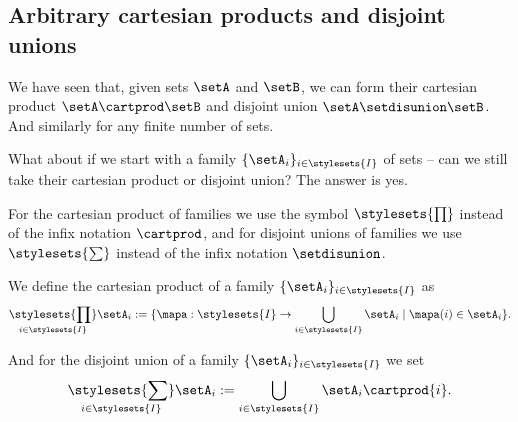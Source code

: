\subsection{Arbitrary cartesian products and disjoint unions}

We have seen that, given sets $\setA$ and $\setB$, we can form their cartesian product $\setA \cartprod \setB$ and disjoint union $\setA \setdisunion \setB$.
And similarly for any finite number of sets.

What about if we start with a family $\{ \setA_i \}_{i \in \stylesets{I}}$ of sets -- can we still take their cartesian product or disjoint union?
The answer is yes.

For the cartesian product of families we use the symbol $\stylesets{\prod}$ instead of the infix notation $\cartprod$, and for disjoint unions of families we use $\stylesets{\sum}$ instead of the infix notation $\setdisunion$.

We define the cartesian product of a family $\{ \setA_i \}_{i \in \stylesets{I}}$ as
\begin{equation}
    \underset{i \in \stylesets{I}}{\stylesets{\prod}}  \setA_i  := \{ \mapa : \stylesets{I} \to \bigcup_{i \in \stylesets{I} } \setA_i \mid \mapa(i) \in \setA_i \}.
\end{equation}

And for the disjoint union of a family $\{ \setA_i \}_{i \in \stylesets{I}}$ we set
\begin{equation}
    \underset{i \in \stylesets{I}}{\stylesets{\sum}} \setA_i := \bigcup_{i \in \stylesets{I}} \setA_i \cartprod \{ i \}.
\end{equation}

